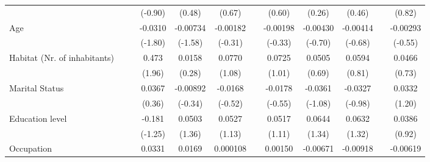{\begin{tabular}{l*{11}{c}}
                &                  &                  &  (-0.90)         &   (0.48)         &   (0.67)         &                  &   (0.60)         &   (0.26)         &   (0.46)         &                  &   (0.82)         \\
Age             &                  &                  &  -0.0310         & -0.00734         & -0.00182         &                  & -0.00198         & -0.00430         & -0.00414         &                  & -0.00293         \\
                &                  &                  &  (-1.80)         &  (-1.58)         &  (-0.31)         &                  &  (-0.33)         &  (-0.70)         &  (-0.68)         &                  &  (-0.55)         \\
Habitat (Nr. of inhabitants)&                  &                  &    0.473\sym{*}  &   0.0158         &   0.0770         &                  &   0.0725         &   0.0505         &   0.0594         &                  &   0.0466         \\
                &                  &                  &   (1.96)         &   (0.28)         &   (1.08)         &                  &   (1.01)         &   (0.69)         &   (0.81)         &                  &   (0.73)         \\
Marital Status  &                  &                  &   0.0367         & -0.00892         &  -0.0168         &                  &  -0.0178         &  -0.0361         &  -0.0327         &                  &   0.0332         \\
                &                  &                  &   (0.36)         &  (-0.34)         &  (-0.52)         &                  &  (-0.55)         &  (-1.08)         &  (-0.98)         &                  &   (1.20)         \\
Education level &                  &                  &   -0.181         &   0.0503         &   0.0527         &                  &   0.0517         &   0.0644         &   0.0632         &                  &   0.0386         \\
                &                  &                  &  (-1.25)         &   (1.36)         &   (1.13)         &                  &   (1.11)         &   (1.34)         &   (1.32)         &                  &   (0.92)         \\
Occupation      &                  &                  &   0.0331         &   0.0169         & 0.000108         &                  &  0.00150         & -0.00671         & -0.00918         &                  & -0.00619         \\

\end{tabular}}
